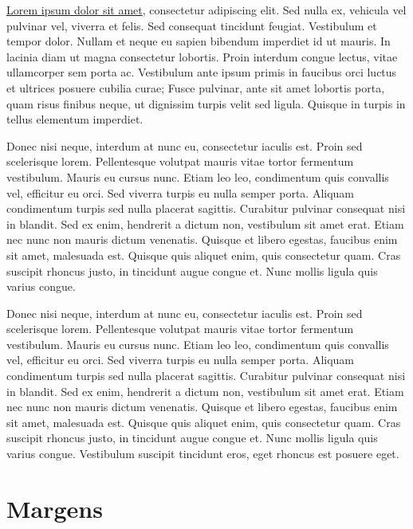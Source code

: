 \documentclass[12pt]{article}
\begin{document}
\underline{Lorem ipsum dolor sit amet}, consectetur adipiscing elit. Sed nulla ex, vehicula vel pulvinar vel, viverra et felis. Sed consequat tincidunt feugiat. Vestibulum et tempor dolor. Nullam et neque eu sapien bibendum imperdiet id ut mauris. In lacinia diam ut magna consectetur lobortis. Proin interdum congue lectus, vitae ullamcorper sem porta ac. Vestibulum ante ipsum primis in faucibus orci luctus et ultrices posuere cubilia curae; Fusce pulvinar, ante sit amet lobortis porta, quam risus finibus neque, ut dignissim turpis velit sed ligula. Quisque in turpis in tellus elementum imperdiet.


\hspace{2cm} %
Donec nisi neque, interdum at nunc eu, consectetur iaculis est. Proin sed scelerisque lorem. Pellentesque volutpat mauris vitae tortor fermentum vestibulum. Mauris eu cursus nunc. Etiam leo leo, condimentum quis convallis vel, efficitur eu orci. Sed viverra turpis eu nulla semper porta. Aliquam condimentum turpis sed nulla placerat sagittis. Curabitur pulvinar consequat nisi in blandit. Sed ex enim, hendrerit a dictum non, vestibulum sit amet erat. Etiam nec nunc non mauris dictum venenatis. Quisque et libero egestas, faucibus enim sit amet, malesuada est. Quisque quis aliquet enim, quis consectetur quam. Cras suscipit rhoncus justo, in tincidunt augue congue et. Nunc mollis ligula quis varius congue.

\begin{spacing}{3} %

Donec nisi neque, interdum at nunc eu, consectetur iaculis est. Proin sed scelerisque lorem. Pellentesque volutpat mauris vitae tortor fermentum vestibulum. Mauris eu cursus nunc. Etiam leo leo, condimentum quis convallis vel, efficitur eu orci. Sed viverra turpis eu nulla semper porta. Aliquam condimentum turpis sed nulla placerat sagittis. Curabitur pulvinar consequat nisi in blandit. Sed ex enim, hendrerit a dictum non, vestibulum sit amet erat. Etiam nec nunc non mauris dictum venenatis. Quisque et libero egestas, faucibus enim sit amet, malesuada est. Quisque quis aliquet enim, quis consectetur quam. Cras suscipit rhoncus justo, in tincidunt augue congue et. Nunc mollis ligula quis varius congue. Vestibulum suscipit tincidunt eros, eget rhoncus est posuere eget.

\end{spacing}

\section{Margens}
\end{document}
